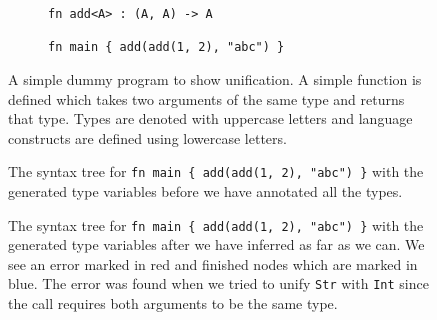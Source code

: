 \begin{figure}[h!]
\centering
\begin{subfigure}{.5\textwidth}
  \begin{verbatim}
fn add<A> : (A, A) -> A

fn main { add(add(1, 2), "abc") }
\end{verbatim}
  \end{subfigure}
  \caption{A simple dummy program to show unification. A simple  function is defined which takes two arguments of the same type and returns that type. Types are denoted with uppercase letters and language constructs are defined using lowercase letters.}
  \label{fig:progUni}
\end{figure}

\begin{figure}[h!]
\centering
{}
  \cprotect\caption{The syntax tree for \verb|fn main { add(add(1, 2), "abc") }| with the generated type variables before we have annotated all the types.}
  \label{fig:progUniTree}
\end{figure}

\begin{figure}[h!]
\centering
{}
  \cprotect\caption{The syntax tree for \verb|fn main { add(add(1, 2), "abc") }| with the generated type variables after we have inferred as far as we can. We see an error marked in red and finished nodes which are marked in blue. The error was found when we tried to unify \verb|Str| with \verb|Int| since the call requires both arguments to be the same type.}
  \label{fig:progUniTreeAfter}
\end{figure}


